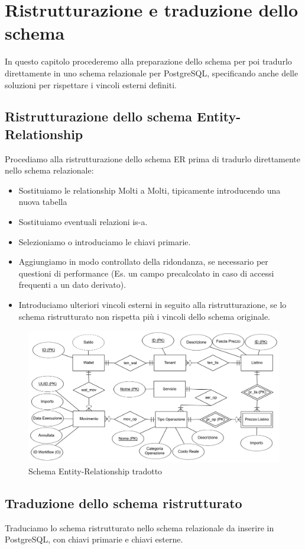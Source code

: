 \chapter{Ristrutturazione e traduzione dello schema}
In questo capitolo procederemo alla preparazione dello schema per poi tradurlo direttamente in uno schema relazionale per PostgreSQL, specificando anche delle soluzioni per
rispettare i vincoli esterni definiti.
\section{Ristrutturazione dello schema Entity-Relationship}
Procediamo alla ristrutturazione dello schema ER prima di tradurlo direttamente nello schema relazionale:
\begin{itemize}
  \item Sostituiamo le relationship Molti a Molti, tipicamente introducendo una nuova tabella
  \item Sostituiamo eventuali relazioni is-a.
  \item Selezioniamo o introduciamo le chiavi primarie.
  \item Aggiungiamo in modo controllato della ridondanza, se necessario per questioni di performance (Es. un campo precalcolato in caso di accessi frequenti a un dato derivato).
  \item Introduciamo ulteriori vincoli esterni in seguito alla ristrutturazione, se lo schema ristrutturato non rispetta pi\`u i vincoli dello schema originale.
\end{itemize}
\begin{figure}[H]
  \centering
  \includegraphics[width=13cm]{images/db-diagrams/er-diagram-ristrutturato.png}
  \caption{Schema Entity-Relationship tradotto}
\end{figure}

\section{Traduzione dello schema ristrutturato}
Traduciamo lo schema ristrutturato nello schema relazionale da inserire in PostgreSQL, con chiavi primarie e chiavi esterne.

